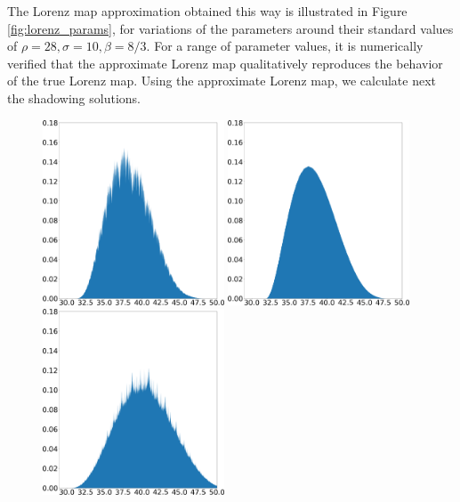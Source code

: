 The Lorenz map approximation obtained this way is illustrated in Figure \ref{fig:lorenz_params}, for variations of the parameters around their standard values of 
$\rho = 28, \sigma = 10, \beta = 8/3.$ For a range of parameter values, it is numerically verified that the approximate Lorenz map qualitatively reproduces the behavior of the true Lorenz map. Using the approximate Lorenz map, we calculate next the shadowing solutions. 
\begin{figure}
    \centering
    \includegraphics[width=0.48\textwidth]{lorenz_shadow_density_lorenz_zmax_15_28_2.67.json.png}
    \hspace{0.005\textwidth}
    \includegraphics[width=0.48\textwidth]{baseline_density_lorenz_zmax_15_28_2.67.json.png}
    \\
    \includegraphics[width=0.48\textwidth]{lorenz_shadow_density_lorenz_zmax_10_30_2.67.json.png}

\end{figure}
